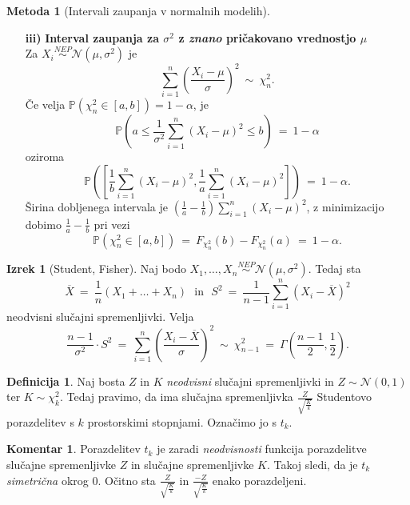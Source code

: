 \documentclass[11pt]{article}
\newcommand{\p}{\mathbb{P}}
\newcommand{\1}{\mathbbm{1}}
\newcommand{\n}{\mathcal{N}}
\theoremstyle{definition}
\newtheorem{definicija}{Definicija}[section]
\theoremstyle{definition}
\theoremstyle{definition}
\newtheorem{izrek}{Izrek}[section]
\newtheorem*{komentar}{Komentar}
\newtheorem{metoda}{Metoda}
\begin{document}
\begin{metoda}[Intervali zaupanja v normalnih modelih]
\begin{enumerate}
\item[\textbf{iii)}] \textbf{Interval zaupanja za $\sigma^2$ z \textit{znano} pričakovano vrednostjo $\mu$} \\
\noindent Za $X_i \overset{NEP}{\sim} \n(\mu, \sigma^2)$ je 
$$\sum_{i=1}^n \left(\frac{X_i - \mu}{\sigma}\right)^2 ~\sim~ \chi_n^2.$$
Če velja $\p(\chi_n^2 \in [a, b]) = 1-\alpha$, je
$$\p\left(a \leq \frac{1}{\sigma^2}\sum_{i=1}^n(X_i - \mu)^2 \leq b\right) ~=~ 1 - \alpha$$
oziroma
$$\p\left(\left[\frac{1}{b}\sum_{i=1}^n(X_i - \mu)^2, \frac{1}{a}\sum_{i=1}^n(X_i - \mu)^2\right]\right) ~=~ 1 - \alpha.$$
Širina dobljenega intervala je $\left(\frac{1}{a}-\frac{1}{b}\right)\sum_{i=1}^n(X_i - \mu)^2$, z minimizacijo dobimo $\frac{1}{a}-\frac{1}{b}$ pri vezi
$$\p(\chi_n^2 \in [a, b]) ~=~ F_{\chi_n^2}(b) - F_{\chi_n^2}(a) ~=~ 1 - \alpha.$$

\end{enumerate}

\end{metoda}
\vspace{0.5cm}

\begin{izrek}[Student, Fisher]

Naj bodo $X_1, \ldots, X_n \overset{NEP}{\sim} \n(\mu, \sigma^2)$. Tedaj sta 
$$\overline{X} ~=~ \frac{1}{n}(X_1 + \ldots + X_n) ~~~\text{in}~~~ S^2 ~=~ \frac{1}{n-1} \sum_{i=1}^n (X_i - \overline{X})^2$$
neodvisni slučajni spremenljivki. Velja
$$\frac{n-1}{\sigma^2} \cdot S^2 ~=~ \sum_{i=1}^n \left( \frac{X_i - \overline{X}}{\sigma} \right)^2  ~\sim~ \chi_{n-1}^2 ~=~ \Gamma\left( \frac{n-1}{2}, \frac{1}{2} \right).$$

\end{izrek}
\vspace{0.5cm}

\begin{definicija}

Naj bosta $Z$ in $K$ \textit{neodvisni} slučajni spremenljivki in \hbox{$Z \sim \n(0, 1)$} ter $K \sim \chi_k^2$. Tedaj pravimo, da ima slučajna spremenljivka $\frac{Z}{\sqrt{\frac{K}{k}}}$ Studentovo porazdelitev s $k$ prostorskimi stopnjami. Označimo jo s $t_k$.

\end{definicija}
\vspace{0.5cm}

\begin{komentar}

Porazdelitev $t_k$ je zaradi \textit{neodvisnosti} funkcija porazdelitve slučajne spremenljivke $Z$ in slučajne spremenljivke $K$. Takoj sledi, da je $t_k$ \textit{simetrična} okrog $0$. Očitno sta $\frac{Z}{\sqrt{\frac{K}{k}}}$ in $\frac{-Z}{\sqrt{\frac{K}{k}}}$ enako porazdeljeni.

\end{komentar}
\vspace{0.5cm}
\end{document}
